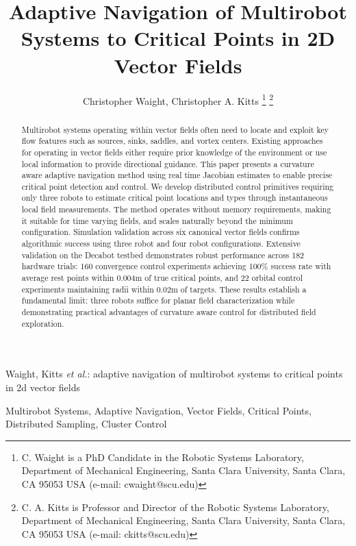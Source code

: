 \documentclass[lettersize,journal]{IEEEtran}
\begin{document}
\title{Adaptive Navigation of Multirobot Systems to Critical Points in 2D Vector Fields}
\author{Christopher Waight, Christopher A. Kitts 
\thanks{C. Waight is a PhD Candidate in the Robotic Systems Laboratory, Department of Mechanical Engineering, Santa Clara University, Santa Clara, CA 95053 USA (e-mail: cwaight@scu.edu)}
\thanks{C. A. Kitts is Professor and Director of the Robotic Systems Laboratory, Department of Mechanical Engineering, Santa Clara University, Santa Clara, CA 95053 USA (e-mail: ckitts@scu.edu)}
}
%
{Waight, Kitts \MakeLowercase{\textit{et al.}: Adaptive Navigation of Multirobot Systems to Critical Points in 2D Vector Fields}}

\maketitle

\begin{abstract}
Multirobot systems operating within vector fields often need to locate and exploit key flow features such as sources, sinks, saddles, and vortex centers. Existing approaches for operating in vector fields either require prior knowledge of the environment or use local information to provide directional guidance. This paper presents a curvature aware adaptive navigation method using real time Jacobian estimates to enable precise critical point detection and control. We develop distributed control primitives requiring only three robots to estimate critical point locations and types through instantaneous local field measurements. The method operates without memory requirements, making it suitable for time varying fields, and scales naturally beyond the minimum configuration. Simulation validation across six canonical vector fields confirms algorithmic success using three robot and four robot configurations. Extensive validation on the Decabot testbed demonstrates robust performance across 182 hardware trials: 160 convergence control experiments achieving 100\% success rate with average rest points within 0.004m of true critical points, and 22 orbital control experiments maintaining radii within 0.02m of targets. These results establish a fundamental limit: three robots suffice for planar field characterization while demonstrating practical advantages of curvature aware control for distributed field exploration.
\end{abstract}

\begin{IEEEkeywords}
Multirobot Systems, Adaptive Navigation, Vector Fields, Critical Points, Distributed Sampling, Cluster Control
\end{IEEEkeywords}
\end{document}
